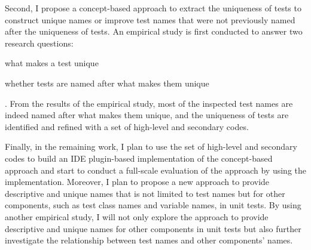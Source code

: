 \documentclass[proposal.tex]{subfiles}
\begin{document}
Second, I propose a concept-based approach to extract the uniqueness of tests to construct unique names or improve test names that were not previously named after the uniqueness of tests.
%
An empirical study is first conducted to answer two research questions:
\begin{enumerate*}
\item what makes a test unique
\item whether tests are named after what makes them unique
\end{enumerate*}.
%
From the results of the empirical study, most of the inspected test names are indeed named after what makes them unique, and the uniqueness of tests are identified and refined with a set of high-level and secondary codes.


Finally, in the remaining work, I plan to use the set of high-level and secondary codes to build an IDE plugin-based implementation of the concept-based approach and start to conduct a full-scale evaluation of the approach by using the implementation.
%
Moreover, I plan to propose a new approach to provide descriptive and unique names that is not limited to test names but for other components, such as test class names and variable names, in unit tests.
%
By using another empirical study, I will not only explore the approach to provide descriptive and unique names for other components in unit tests but also further investigate the relationship between test names and other components' names.
\end{document}
